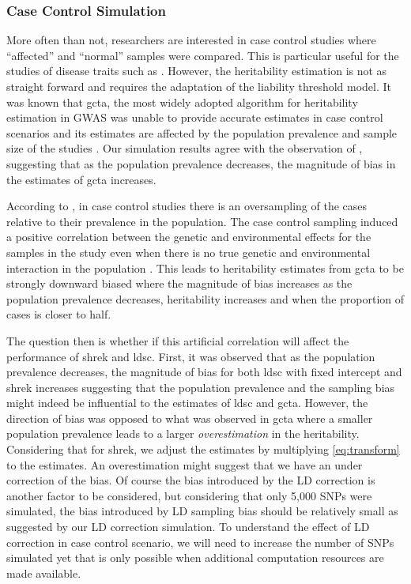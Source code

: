 	\subsubsection{Case Control Simulation}
	More often than not, researchers are interested in case control studies where ``affected'' and ``normal'' samples were compared. 
	This is particular useful for the studies of disease traits such as .
	However, the heritability estimation is not as straight forward and requires the adaptation of the liability threshold model.
	It was known that \gls{gcta}, the most widely adopted algorithm for heritability estimation in \gls{GWAS} was unable to provide accurate estimates in case control scenarios and its estimates are affected by the population prevalence and sample size of the studies \citep{Golan2014}.
	Our simulation results agree with the observation of \citet{Golan2014}, suggesting that as the population prevalence decreases, the magnitude of bias in the estimates of \gls{gcta} increases.
	
	According to \citet{Golan2014}, in case control studies there is an oversampling of the cases relative to their prevalence in the population.
	The case control sampling induced a positive correlation between the genetic and environmental effects for the samples in the study even when there is no true genetic and environmental interaction in the population \citep{Golan2014}.
	This leads to heritability estimates from \gls{gcta} to be strongly downward biased where the magnitude of bias increases as the population prevalence decreases, heritability increases and when the proportion of cases is closer to half.
	
	The question then is whether if this artificial correlation will affect the performance of \gls{shrek} and \gls{ldsc}.
	First, it was observed that as the population prevalence decreases, the magnitude of bias for both \gls{ldsc} with fixed intercept and \gls{shrek} increases suggesting that the population prevalence and the sampling bias might indeed be influential to the estimates of \gls{ldsc} and \gls{gcta}.
	However, the direction of bias was opposed to what was observed in \gls{gcta} where a smaller population prevalence leads to a larger \emph{overestimation} in the heritability.
	Considering that for \gls{shrek}, we adjust the estimates by multiplying \cref{eq:transform} to the estimates. 
	An overestimation might suggest that we have an under correction of the bias. 
	Of course the bias introduced by the \gls{LD} correction is another factor to be considered, but considering that only 5,000 \glspl{SNP} were simulated, the bias introduced by \gls{LD} sampling bias should be relatively small as suggested by our \gls{LD} correction simulation.
	To understand the effect of \gls{LD} correction in case control scenario, we will need to increase the number of \glspl{SNP} simulated yet that is only possible when additional computation resources are made available.
	
